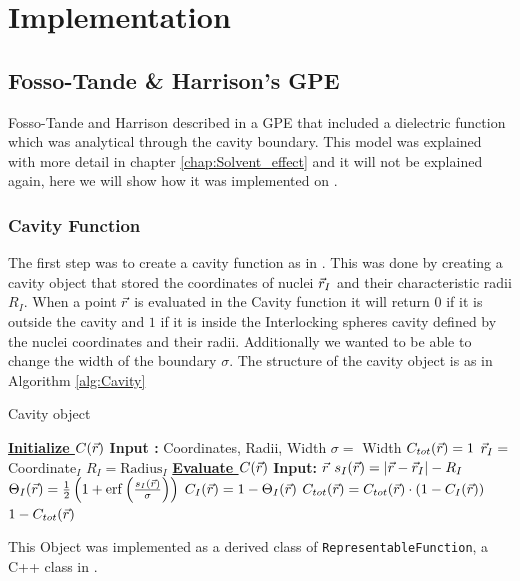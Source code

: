 \documentclass[../master_thesis.tex]{subfiles}
\begin{document}
\chapter{Implementation}\label{chap:implementation}
\section{Fosso-Tande \& Harrison's \ac{GPE}}
Fosso-Tande and Harrison described in \cite{FossoTande:2013ka} a \ac{GPE} that
included a dielectric function which was analytical through the cavity boundary.
This model was explained with more detail in chapter \ref{chap:Solvent_effect} and
it will not be explained again, here we will show how it was implemented on
\mrchem.
\subsection{Cavity Function}
The first step was to create a cavity function as in \cite{FossoTande:2013ka}.
This was done by creating a cavity object that stored the coordinates of nuclei
$\vec{r}_I$ and their characteristic radii $R_I$. When a point $\vec{r}$ is evaluated
in the Cavity function it will return $0$ if it is outside the cavity and $1$ if
it is inside the Interlocking spheres cavity defined by the nuclei coordinates
and their radii. Additionally we wanted to be able to change the width of the
boundary $\sigma$. The structure of the cavity object is as in Algorithm \ref{alg:Cavity}

\begin{algorithm}
  \caption{Cavity object}\label{alg:Cavity}
  \begin{algorithmic}
    \STATE \underline{\textbf{Initialize $C(\vec{r})$}}
    \STATE \textbf{Input :} Coordinates, Radii, Width
    \STATE $\sigma = $ Width
    \STATE $C_{tot}(\vec{r}) = 1$
     \STATE $\vec{r}_I = $ Coordinate$_I$
     \STATE $R_I = \text{Radius}_I$
    \ENDFOR
    \STATE
    \STATE \underline{\textbf{Evaluate $C(\vec{r})$}}
    \STATE \textbf{Input: } $\vec{r}$
      \STATE $s_I(\vec{r}) = \abs{\vec{r} - \vec{r}_I} - R_I$
      \STATE $\Theta_I(\rvec) = \frac{1}{2}\left(1 + \erf\left(\frac{s_I(\rvec)}{\sigma}\right)\right)$
      \STATE $ C_I(\vec{r}) = 1 -\Theta_I(\vec{r}) $
      \STATE $ C_{tot}(\vec{r}) = C_{tot}(\vec{r}) \cdot (1 - C_{I}(\vec{r}))$
    \ENDFOR
    \RETURN $ 1 - C_{tot}(\vec{r})$
  \end{algorithmic}
\end{algorithm}
This Object was implemented as a derived class of \verb!RepresentableFunction!,
a C++ class in \mrchem.
\end{document}
